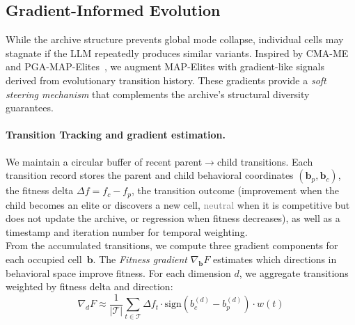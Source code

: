 \subsection{Gradient-Informed Evolution} \label{sec:gradient}

While the archive structure prevents global mode collapse, individual cells may stagnate if the LLM repeatedly produces similar variants. Inspired by CMA-ME~\citep{cmame} and PGA-MAP-Elites~\citep{pgamapelites}, we augment MAP-Elites with gradient-like signals derived from evolutionary transition history. These gradients provide a \textit{soft steering mechanism} that complements the archive's structural diversity guarantees.


\paragraph{Transition Tracking and gradient estimation.}
We maintain a circular buffer of recent parent$\to$child transitions. Each transition record stores the parent and child behavioral coordinates $(\mathbf{b}_p, \mathbf{b}_c)$, the fitness delta $\Delta f = f_c - f_p$, the transition outcome (\textcolor{green!60!black}{improvement} when the child becomes an elite or discovers a new cell, \textcolor{gray}{neutral} when it is competitive but does not update the archive, or \textcolor{red!70!black}{regression} when fitness decreases), as well as a timestamp and iteration number for temporal weighting.\\
%
%
From the accumulated transitions, we compute three gradient components for each occupied cell~$\mathbf{b}$. The \textit{Fitness gradient} $\nabla_\mathbf{b} F$ estimates which directions in behavioral space improve fitness. For each dimension $d$, we aggregate transitions weighted by fitness delta and direction:
\begin{equation}
    \nabla_d F \approx \frac{1}{|\mathcal{T}|} \sum_{t \in \mathcal{T}} \Delta f_t \cdot \text{sign}(b_c^{(d)} - b_p^{(d)}) \cdot w(t)
\end{equation}
